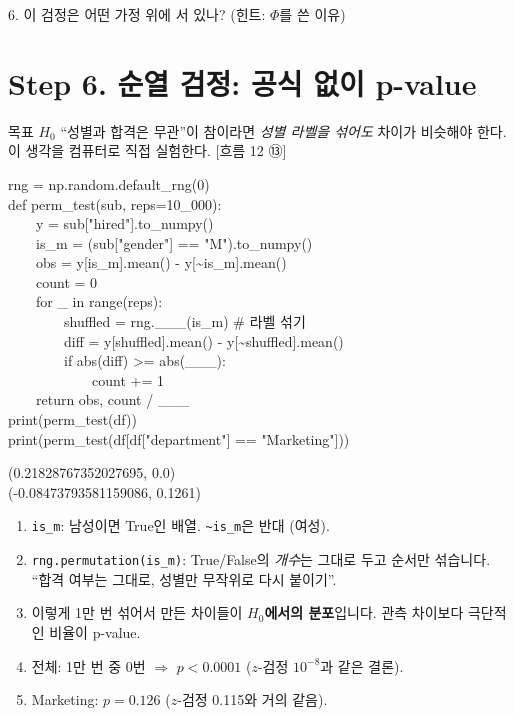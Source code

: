 \documentclass[11pt,a4paper]{article}
\newcommand{\code}[1]{\texttt{#1}}
\newcommand{\Wc}[1]{{\scriptsize\textsf{\color{blue!60!black}[흐름 #1]}}}
\begin{document}
\begin{qbox}
6. 이 검정은 어떤 가정 위에 서 있나? (힌트: $\Phi$를 쓴 이유)
\end{qbox}

\section{Step 6. 순열 검정: 공식 없이 p-value}
\begin{goalbox}{목표}
$H_0$ ``성별과 합격은 무관''이 참이라면 \emph{성별 라벨을 섞어도} 차이가 비슷해야 한다. 이 생각을 컴퓨터로 직접 실험한다. \Wc{12 ⑬}
\end{goalbox}

\begin{codebox}
rng = np.random.default\_rng(0)\\
def perm\_test(sub, reps=10\_000):\\
\ \ \ \ y = sub["hired"].to\_numpy()\\
\ \ \ \ is\_m = (sub["gender"] == "M").to\_numpy()\\
\ \ \ \ obs = y[is\_m].mean() - y[\textasciitilde is\_m].mean()\\
\ \ \ \ count = 0\\
\ \ \ \ for \_ in range(reps):\\
\ \ \ \ \ \ \ \ shuffled = rng.\_\_\_(is\_m) \hfill \# 라벨 섞기\\
\ \ \ \ \ \ \ \ diff = y[shuffled].mean() - y[\textasciitilde shuffled].mean()\\
\ \ \ \ \ \ \ \ if abs(diff) >= abs(\_\_\_):\\
\ \ \ \ \ \ \ \ \ \ \ \ count += 1\\
\ \ \ \ return obs, count / \_\_\_\\[3pt]
print(perm\_test(df))\\
print(perm\_test(df[df["department"] == "Marketing"]))
\end{codebox}
\begin{outbox}
(0.21828767352027695, 0.0)\\
(-0.08473793581159086, 0.1261)
\end{outbox}

\begin{howbox}
\begin{enumerate}
\item \code{is\_m}: 남성이면 True인 배열. \code{\textasciitilde is\_m}은 반대 (여성).
\item \code{rng.permutation(is\_m)}: True/False의 \emph{개수}는 그대로 두고 순서만 섞습니다. ``합격 여부는 그대로, 성별만 무작위로 다시 붙이기''.
\item 이렇게 1만 번 섞어서 만든 차이들이 \textbf{$H_0$에서의 분포}입니다. 관측 차이보다 극단적인 비율이 p-value.
\item 전체: 1만 번 중 0번 $\Rightarrow$ $p<0.0001$ ($z$-검정 $10^{-8}$과 같은 결론).
\item Marketing: $p=0.126$ ($z$-검정 0.115와 거의 같음).
\end{enumerate}
\end{howbox}
\end{document}
